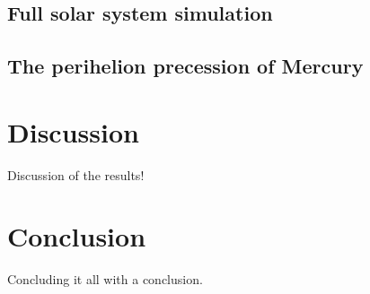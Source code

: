 \documentclass[aps,reprint]{revtex4-1}
\newcommand\blankpage{%
  \null
  \thispagestyle{empty}%
  \addtocounter{page}{-1}%
  \newpage}
\begin{document}
\subsection{Full solar system simulation}
\subsection{The perihelion precession of Mercury}

\section{Discussion}
\label{sec:discussion}
Discussion of the results!
\section{Conclusion}
\label{sec:conclusion}
Concluding it all with a conclusion.

\blankpage
\appendix
\end{document}

